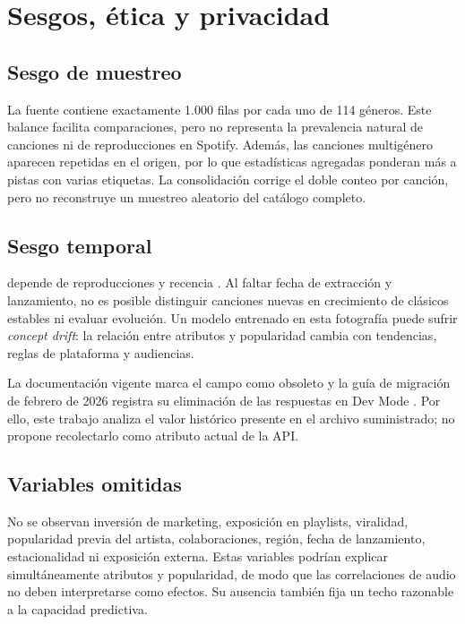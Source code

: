 \section{Sesgos, ética y privacidad}

\subsection{Sesgo de muestreo}

La fuente contiene exactamente 1.000 filas por cada uno de 114 géneros. Este balance facilita
comparaciones, pero no representa la prevalencia natural de canciones ni de reproducciones en
Spotify. Además, las canciones multigénero aparecen repetidas en el origen, por lo que estadísticas
agregadas ponderan más a pistas con varias etiquetas. La consolidación corrige el doble conteo por
canción, pero no reconstruye un muestreo aleatorio del catálogo completo.

\subsection{Sesgo temporal}

 depende de reproducciones y recencia \citep{spotify_track_api}. Al faltar fecha de
extracción y lanzamiento, no es posible distinguir canciones nuevas en crecimiento de clásicos
estables ni evaluar evolución. Un modelo entrenado en esta fotografía puede sufrir \emph{concept
drift}: la relación entre atributos y popularidad cambia con tendencias, reglas de plataforma y
audiencias.

La documentación vigente marca el campo como obsoleto y la guía de migración de febrero de 2026
registra su eliminación de las respuestas en Dev Mode \citep{spotify_api_migration_2026}. Por ello,
este trabajo analiza el valor histórico presente en el archivo suministrado; no propone recolectarlo
como atributo actual de la API.

\subsection{Variables omitidas}

No se observan inversión de marketing, exposición en playlists, viralidad, popularidad previa del
artista, colaboraciones, región, fecha de lanzamiento, estacionalidad ni exposición externa. Estas
variables podrían explicar simultáneamente atributos y popularidad, de modo que las correlaciones de
audio no deben interpretarse como efectos. Su ausencia también fija un techo razonable a la capacidad
predictiva.


